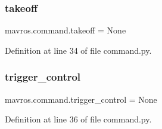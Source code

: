 \subsubsection{\texorpdfstring{takeoff}{takeoff}}
{\footnotesize\ttfamily mavros.\+command.\+takeoff = None}



Definition at line 34 of file command.\+py.

\mbox{\label{namespacemavros_1_1command_a999576761867356758c2dce4f335bc7d}} 
\subsubsection{\texorpdfstring{trigger\_control}{trigger\_control}}
{\footnotesize\ttfamily mavros.\+command.\+trigger\+\_\+control = None}



Definition at line 36 of file command.\+py.

